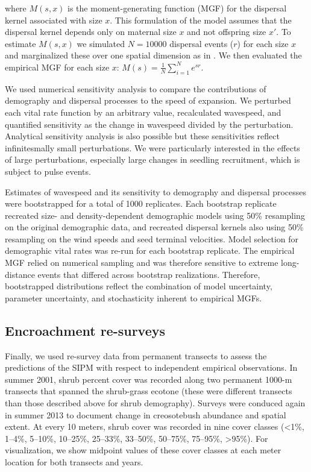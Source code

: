 \documentclass[11pt]{article}\usepackage[]{graphicx}\usepackage[usenames,dvipsnames]{xcolor}
\begin{document}
where $M(s,x)$ is the moment-generating function (MGF) for the dispersal kernel associated with size $x$.
This formulation of the model assumes that the dispersal kernel depends only on maternal size $x$ and not offspring size $x\prime$.
To estimate $M(s,x)$ we simulated $N=10000$ dispersal events ($r$) for each size $x$ and marginalized these over one spatial dimension as in \cite{lewis2006guide}.
We then evaluated the empirical MGF for each size $x$: $M(s)=\frac{1}{N} \sum_{i=1}^{N}e^{sr}$. 

We used numerical sensitivity analysis to compare the contributions of demography and dispersal processes to the speed of expansion. 
We perturbed each vital rate function by an arbitrary value, recalculated wavespeed, and quantified sensitivity as the change in wavespeed divided by the perturbation. 
Analytical sensitivity analysis is also possible \citep{ellner2016data} but these sensitivities reflect infinitesmally small perturbations.
We were particularly interested in the effects of large perturbations, especially large changes in seedling recruitment, which is subject to pulse events. 

Estimates of wavespeed and its sensitivity to demography and dispersal processes were bootstrapped for a total of 1000 replicates.
Each bootstrap replicate recreated size- and density-dependent demographic models using 50\% resampling on the original demographic data, and recreated dispersal kernels also using 50\% resampling on the wind speeds and seed terminal velocities.
Model selection for demographic vital rates was re-run for each bootstrap replicate. 
The empirical MGF relied on numerical sampling and was therefore sensitive to extreme long-distance events that differed across bootstrap realizations. 
Therefore, bootstrapped distributions reflect the combination of model uncertainty, parameter uncertainty, and stochasticity inherent to empirical MGFs. 

\subsection*{Encroachment re-surveys}
Finally, we used re-survey data from permanent transects to assess the predictions of the SIPM with respect to independent empirical observations. 
In summer 2001, shrub percent cover was recorded along two permanent 1000-m transects that spanned the shrub-grass ecotone (these were different transects than those described above for shrub demography). 
Surveys were conduced again in summer 2013 to document change in creosotebush abundance and spatial extent. 
At every 10 meters, shrub cover was recorded in nine cover classes (<1\%, 1--4\%, 5--10\%, 10--25\%, 25--33\%, 33--50\%, 50--75\%, 75--95\%, >95\%). 
For visualization, we show midpoint values of these cover classes at each meter location for both transects and years. 
\end{document}
